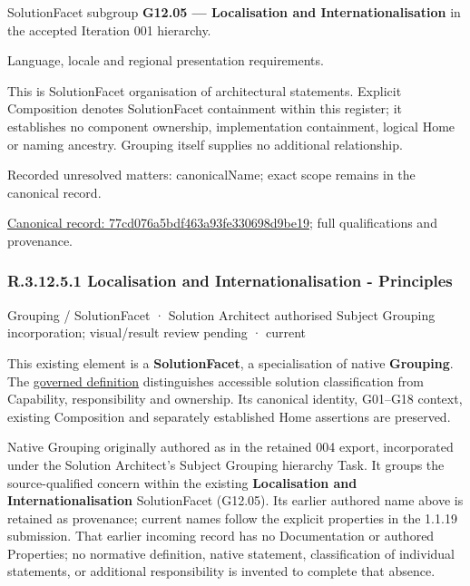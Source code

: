 SolutionFacet subgroup \textbf{G12.05 — Localisation and Internationalisation} in the accepted Iteration 001 hierarchy.



Language, locale and regional presentation requirements.



This is SolutionFacet organisation of architectural statements. Explicit Composition denotes SolutionFacet containment within this register; it establishes no component ownership, implementation containment, logical Home or naming ancestry. Grouping itself supplies no additional relationship.


{\small Recorded unresolved matters: canonicalName; exact scope remains in the canonical record.}\par
{\footnotesize \href{../../../../../../../continuum/grouping/77cd076a5bdf463a93fe330698d9be19.md}{Canonical record: 77cd076a5bdf463a93fe330698d9be19}; full qualifications and provenance.}\par
\subsubsection*{R.3.12.5.1 Localisation and Internationalisation - Principles}
\label{navigation:R.3.12.5.1}

\label{element:f71f084dd9154318b86ca22f0fe8c36d}
{\small Grouping / SolutionFacet · Solution Architect authorised Subject Grouping incorporation; visual/result review pending · current}\par

This existing element is a \textbf{SolutionFacet}, a specialisation of native
\textbf{Grouping}. The \href{\detokenize{../../../../../../../governance/continuum-representation.md#solutionfacet-classification--1119-candidate}}{governed definition}
distinguishes accessible solution classification from Capability, responsibility
and ownership. Its canonical identity, G01–G18 context, existing Composition
and separately established Home assertions are preserved.



Native Grouping originally authored as \texttt{} in the retained 004 export,
incorporated under the Solution Architect's Subject Grouping hierarchy Task.
It groups the source-qualified \texttt{} concern within
the existing \textbf{Localisation and Internationalisation} SolutionFacet (G12.05). Its earlier authored name above is retained as provenance; current names
follow the explicit properties in the 1.1.19 submission.
That earlier incoming record has no Documentation or authored Properties; no normative
definition, native statement, classification of individual statements, or
additional responsibility is invented to complete that absence.



